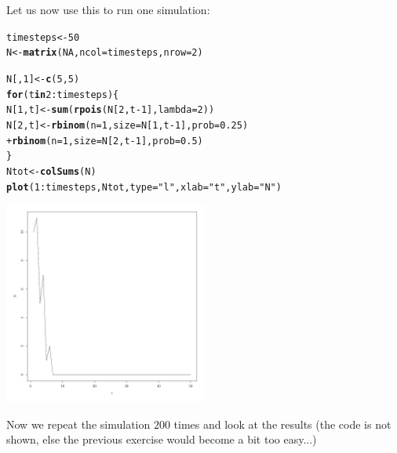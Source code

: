 \documentclass{article}\usepackage[]{graphicx}\usepackage[]{color}
\makeatletter
\newcommand{\hlnum}[1]{\textcolor[rgb]{0.686,0.059,0.569}{#1}}%
\newcommand{\hlstr}[1]{\textcolor[rgb]{0.192,0.494,0.8}{#1}}%
\newcommand{\hlopt}[1]{\textcolor[rgb]{0,0,0}{#1}}%
\newcommand{\hlstd}[1]{\textcolor[rgb]{0.345,0.345,0.345}{#1}}%
\newcommand{\hlkwa}[1]{\textcolor[rgb]{0.161,0.373,0.58}{\textbf{#1}}}%
\newcommand{\hlkwb}[1]{\textcolor[rgb]{0.69,0.353,0.396}{#1}}%
\newcommand{\hlkwc}[1]{\textcolor[rgb]{0.333,0.667,0.333}{#1}}%
\newcommand{\hlkwd}[1]{\textcolor[rgb]{0.737,0.353,0.396}{\textbf{#1}}}%
\newenvironment{kframe}{%
 \def\at@end@of@kframe{}%
 \ifinner\ifhmode%
  \def\at@end@of@kframe{\end{minipage}}%
  \begin{minipage}{\columnwidth}%
 \fi\fi%
 \def\FrameCommand##1{\hskip\@totalleftmargin \hskip-\fboxsep
 \colorbox{shadecolor}{##1}\hskip-\fboxsep
     \hskip-\linewidth \hskip-\@totalleftmargin \hskip\columnwidth}%
 \MakeFramed {\advance\hsize-\width
   \@totalleftmargin\z@ \linewidth\hsize
   \@setminipage}}%
 {\par\unskip\endMakeFramed%
 \at@end@of@kframe}
\newenvironment{knitrout}{}{} %
\makeatother
\begin{document}
Let us now use this to run one simulation:
\begin{knitrout}
\color{fgcolor}\begin{kframe}
\begin{alltt}
\hlstd{timesteps}\hlkwb{<-}\hlnum{50}
\hlstd{N}\hlkwb{<-}\hlkwd{matrix}\hlstd{(}\hlnum{NA}\hlstd{,}\hlkwc{ncol}\hlstd{=timesteps,}\hlkwc{nrow}\hlstd{=}\hlnum{2}\hlstd{)}

\hlstd{N[,}\hlnum{1}\hlstd{]}\hlkwb{<-}\hlkwd{c}\hlstd{(}\hlnum{5}\hlstd{,}\hlnum{5}\hlstd{)}
\hlkwa{for}\hlstd{(t} \hlkwa{in} \hlnum{2}\hlopt{:}\hlstd{timesteps)\{}
    \hlstd{N[}\hlnum{1}\hlstd{,t]}\hlkwb{<-}\hlkwd{sum}\hlstd{(}\hlkwd{rpois}\hlstd{(N[}\hlnum{2}\hlstd{,t}\hlopt{-}\hlnum{1}\hlstd{],}\hlkwc{lambda}\hlstd{=}\hlnum{2}\hlstd{))}
    \hlstd{N[}\hlnum{2}\hlstd{,t]}\hlkwb{<-}\hlkwd{rbinom}\hlstd{(}\hlkwc{n}\hlstd{=}\hlnum{1}\hlstd{,}\hlkwc{size}\hlstd{=N[}\hlnum{1}\hlstd{,t}\hlopt{-}\hlnum{1}\hlstd{],}\hlkwc{prob}\hlstd{=}\hlnum{0.25}\hlstd{)}
        \hlopt{+} \hlkwd{rbinom}\hlstd{(}\hlkwc{n}\hlstd{=}\hlnum{1}\hlstd{,}\hlkwc{size}\hlstd{=N[}\hlnum{2}\hlstd{,t}\hlopt{-}\hlnum{1}\hlstd{],}\hlkwc{prob}\hlstd{=}\hlnum{0.5}\hlstd{)}
\hlstd{\}}
\hlstd{Ntot}\hlkwb{<-}\hlkwd{colSums}\hlstd{(N)}
\hlkwd{plot}\hlstd{(}\hlnum{1}\hlopt{:}\hlstd{timesteps,Ntot,}\hlkwc{type}\hlstd{=}\hlstr{"l"}\hlstd{,}\hlkwc{xlab}\hlstd{=}\hlstr{"t"}\hlstd{,}\hlkwc{ylab}\hlstd{=}\hlstr{"N"}\hlstd{)}
\end{alltt}
\end{kframe}

{\centering \includegraphics[width=0.5\textwidth]{figure/dice9-1} 

}



\end{knitrout}
Now we repeat the simulation $200$ times and look at the results (the code is not shown, else the previous exercise would become a bit too easy...)
\end{document}
